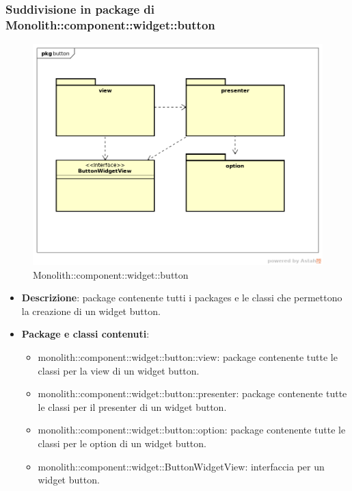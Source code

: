 \subsubsection{Suddivisione in package  di Monolith::component::widget::button}
\label{Monolith::component::widget::button}
\begin{figure}[H]
	\centering
	\includegraphics[scale=0.5]{Sezioni/imgPackage/component_widget_button.png}
	\caption{Monolith::component::widget::button}
\end{figure}
\begin{itemize}
	\item{\textbf{Descrizione}}: package contenente tutti i packages e le classi che permettono la creazione di un widget button.
	\item{\textbf{Package e classi contenuti}}:
	\begin{itemize}
	\item{monolith::component::widget::button::view}: package contenente tutte le classi per la view di un widget button.
	\item{monolith::component::widget::button::presenter}: package contenente tutte le classi per il presenter di un widget button.
	\item{monolith::component::widget::button::option}: package contenente tutte le classi per le option di un widget button.
	\item{monolith::component::widget::ButtonWidgetView}: interfaccia per un widget button.
	\end{itemize}

\end{itemize}


